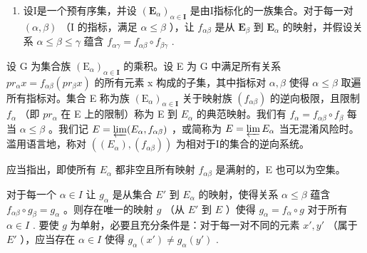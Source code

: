 \begin{enumerate}
\def\labelenumi{\arabic{enumi}.}
\setcounter{enumi}{13}
\tightlist
\item
  设I是一个预有序集，并设 \((\mathbf{E}_{\alpha})_{\alpha \in \mathbf{I}}\) 是由I指标化的一族集合。对于每一对 \((\alpha, \beta)\) （I 的指标，满足 \(\alpha \leqslant \beta\) ），让 \(f_{\alpha \beta}\) 是从 \(\mathbf{E}_{\beta}\) 到 \(\mathbf{E}_{\alpha}\) 的映射，并假设关系 \(\alpha \leqslant \beta \leqslant \gamma\) 蕴含 \(f_{\alpha \gamma} = f_{\alpha \beta} \circ f_{\beta \gamma}\) .
\end{enumerate}

设 G 为集合族 \((\mathrm{E}_{\alpha})_{\alpha\in\mathbf{I}}\) 的乘积。设 E 为 G 中满足所有关系 \(pr_{\alpha}x = f_{\alpha\beta}(pr_{\beta}x)\) 的所有元素 x 构成的子集，其中指标对 \(\alpha, \beta\) 使得 \(\alpha \leqslant \beta\) 取遍所有指标对。集合 E 称为族 \((\mathrm{E}_{\alpha})_{\alpha\in\mathbf{I}}\) 关于映射族 \((f_{\alpha\beta})\) 的逆向极限，且限制 \(f_{\alpha}\) （即 \(pr_{\alpha}\) 在 E 上的限制）称为 E 到 \(E_{\alpha}\) 的典范映射。我们有 \(f_{\alpha} = f_{\alpha\beta} \circ f_{\beta}\) 每当 \(\alpha \leqslant \beta\) 。我们记 \(E = \varprojlim(E_{\alpha}, f_{\alpha\beta})\) ，或简称为 \(E = \varprojlim E_{\alpha}\) 当无混淆风险时。滥用语言地，称对 \(((E_{\alpha}), (f_{\alpha\beta}))\) 为相对于I的集合的逆向系统。

应当指出，即使所有 \(E_{\alpha}\) 都非空且所有映射 \(f_{\alpha\beta}\) 是满射的，E 也可以为空集。

对于每一个 \(\alpha \in I\) 让 \(g_{\alpha}\) 是从集合 \(E'\) 到 \(E_{\alpha}\) 的映射，使得关系 \(\alpha \leqslant \beta\) 蕴含 \(f_{\alpha \beta} \circ g_{\beta} = g_{\alpha}\) 。则存在唯一的映射 \(g\) （从 \(E'\) 到 \(E\) ）使得 \(g_{\alpha} = f_{\alpha} \circ g\) 对于所有 \(\alpha \in I\) . 要使 \(g\) 为单射，必要且充分条件是：对于每一对不同的元素 \(x', y'\) （属于 \(E'\) ），应当存在 \(\alpha \in I\) 使得 \(g_{\alpha}(x') \neq g_{\alpha}(y')\) .

